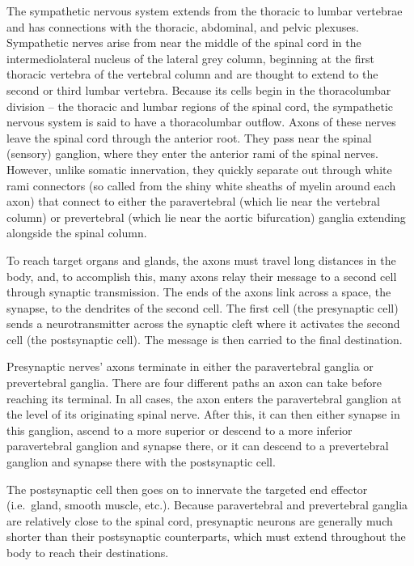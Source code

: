 The sympathetic nervous system extends from the thoracic to lumbar vertebrae and has connections with the thoracic, abdominal, and pelvic plexuses.
Sympathetic nerves arise from near the middle of the spinal cord in the intermediolateral nucleus of the lateral grey column, beginning at the first thoracic vertebra of the vertebral column and are thought to extend to the second or third lumbar vertebra. Because its cells begin in the thoracolumbar division -- the thoracic and lumbar regions of the spinal cord, the sympathetic nervous system is said to have a thoracolumbar outflow. Axons of these nerves leave the spinal cord through the anterior root. They pass near the spinal (sensory) ganglion, where they enter the anterior rami of the spinal nerves. However, unlike somatic innervation, they quickly separate out through white rami connectors (so called from the shiny white sheaths of myelin around each axon) that connect to either the paravertebral (which lie near the vertebral column) or prevertebral (which lie near the aortic bifurcation) ganglia extending alongside the spinal column.

To reach target organs and glands, the axons must travel long distances in the body, and, to accomplish this, many axons relay their message to a second cell through synaptic transmission. The ends of the axons link across a space, the synapse, to the dendrites of the second cell. The first cell (the presynaptic cell) sends a neurotransmitter across the synaptic cleft where it activates the second cell (the postsynaptic cell). The message is then carried to the final destination.

Presynaptic nerves' axons terminate in either the paravertebral ganglia or prevertebral ganglia. There are four different paths an axon can take before reaching its terminal. In all cases, the axon enters the paravertebral ganglion at the level of its originating spinal nerve. After this, it can then either synapse in this ganglion, ascend to a more superior or descend to a more inferior paravertebral ganglion and synapse there, or it can descend to a prevertebral ganglion and synapse there with the postsynaptic cell.

The postsynaptic cell then goes on to innervate the targeted end effector (i.e.~gland, smooth muscle, etc.). Because paravertebral and prevertebral ganglia are relatively close to the spinal cord, presynaptic neurons are generally much shorter than their postsynaptic counterparts, which must extend throughout the body to reach their destinations.

